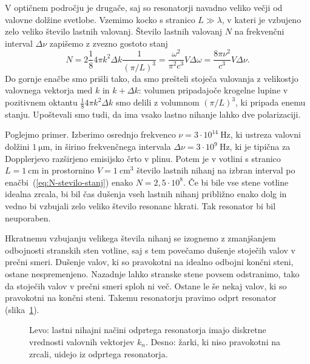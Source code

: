 V optičnem področju je drugače, saj so resonatorji navadno veliko večji
od valovne dolžine svetlobe. Vzemimo kocko s stranico $L\gg \lambda$, 
v kateri je vzbujeno zelo veliko število lastnih valovanj. Število lastnih valovanj $N$ 
na frekvenčni interval $\Delta \nu$ zapišemo z zvezno gostoto stanj
\begin{equation}
N=2 \frac{1}{8} 4\pi k^{2}\Delta k \frac{1}{(\pi/L)^3}=\frac{\omega^{2}}{\pi^{2}c^{3}}V\Delta\omega=
\frac{8\pi \nu^{2}}{c^{3}}V\Delta\nu.
\label{eq:N-stevilo-stanj}
\end{equation}
Do gornje enačbe smo prišli tako, da smo prešteli stoječa valovanja z velikostjo
valovnega vektorja med $k$ in $k+\Delta k$: volumen pripadajoče krogelne lupine v pozitivnem oktantu
$\frac{1}{8} 4\pi k^{2}\Delta k$ smo delili z volumnom $(\pi/L)^3$, ki pripada enemu stanju. 
Upoštevali smo tudi, da ima vsako lastno nihanje lahko dve polarizaciji.

Poglejmo primer. Izberimo osrednjo frekvenco $\nu=3\cdot10^{14}~\si{\hertz}$, ki
ustreza valovni dolžini $1~\si{\micro\metre}$, in širino frekvenčnega
intervala $\Delta\nu=3\cdot10^{9}~\si{\hertz}$, ki je tipična za Dopplerjevo
razširjeno emisijsko črto v plinu. 
Potem je v votlini s stranico $L=1~\si{\centi\metre}$ 
in prostornino $V=1~\si{\centi\metre^3}$ število lastnih nihanj na izbran interval 
po enačbi~(\ref{eq:N-stevilo-stanj}) enako
$N=2,5\cdot10^{8}$. Če bi bile vse stene votline idealna zrcala,
bi bil čas dušenja vseh lastnih nihanj približno enako dolg in vedno bi vzbujali
zelo veliko število resonanc hkrati. Tak resonator bi bil neuporaben.

Hkratnemu vzbujanju velikega števila nihanj se izognemo z zmanjšanjem odbojnosti
stranskih sten votline, saj s tem povečamo dušenje stoječih valov v prečni smeri.
Dušenje valov, ki so pravokotni na idealno odbojni končni steni, ostane nespremenjeno.
Nazadnje lahko stranske stene povsem odstranimo, tako da stoječih valov v prečni smeri
sploh ni več. Ostane le še nekaj valov, ki so pravokotni na končni
steni. Takemu resonatorju pravimo odprt resonator 
(slika~\ref{fig:Odprt_resonator}).
\begin{figure}[h]
\centering
\def\svgwidth{120truemm} 

\caption{Levo: lastni nihajni načini odprtega resonatorja imajo 
diskretne vrednosti valovnih vektorjev $k_{n}$. Desno: žarki, ki niso pravokotni na zrcali, 
uidejo iz odprtega resonatorja.}
\label{fig:Odprt_resonator}
\end{figure}

